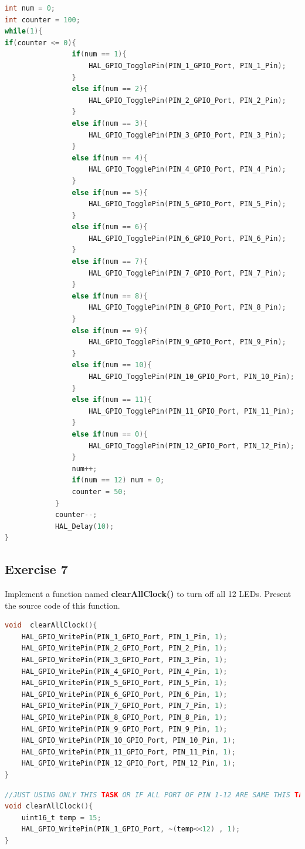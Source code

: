 \documentclass[twoside, final]{hcmut_report}
\begin{document}
\begin{lstlisting}[language=C, caption=Source code for Exercise 6]
int num = 0;
int counter = 100;
while(1){
if(counter <= 0){
			  	if(num == 1){
			  		HAL_GPIO_TogglePin(PIN_1_GPIO_Port, PIN_1_Pin);
			  	}
			  	else if(num == 2){
			  		HAL_GPIO_TogglePin(PIN_2_GPIO_Port, PIN_2_Pin);
			  	}
			  	else if(num == 3){
			  		HAL_GPIO_TogglePin(PIN_3_GPIO_Port, PIN_3_Pin);
			  	}
			  	else if(num == 4){
			  		HAL_GPIO_TogglePin(PIN_4_GPIO_Port, PIN_4_Pin);
			  	}
			  	else if(num == 5){
			  		HAL_GPIO_TogglePin(PIN_5_GPIO_Port, PIN_5_Pin);
			  	}
			  	else if(num == 6){
			  		HAL_GPIO_TogglePin(PIN_6_GPIO_Port, PIN_6_Pin);
			  	}
			  	else if(num == 7){
			  		HAL_GPIO_TogglePin(PIN_7_GPIO_Port, PIN_7_Pin);
			  	}
			  	else if(num == 8){
			  		HAL_GPIO_TogglePin(PIN_8_GPIO_Port, PIN_8_Pin);
			  	}
			  	else if(num == 9){
			  		HAL_GPIO_TogglePin(PIN_9_GPIO_Port, PIN_9_Pin);
			  	}
			  	else if(num == 10){
			  		HAL_GPIO_TogglePin(PIN_10_GPIO_Port, PIN_10_Pin);
			  	}
			  	else if(num == 11){
			  		HAL_GPIO_TogglePin(PIN_11_GPIO_Port, PIN_11_Pin);
			  	}
			  	else if(num == 0){
			  		HAL_GPIO_TogglePin(PIN_12_GPIO_Port, PIN_12_Pin);
			  	}
		  		num++;
		  		if(num == 12) num = 0;
		  		counter = 50;
		  	}
		  	counter--;
		  	HAL_Delay(10);
}
\end{lstlisting}

\subsection{Exercise 7}
Implement a function named \textbf{clearAllClock()} to turn off all 12 LEDs. Present the source code of this function.

\begin{lstlisting}[language=C, caption=Source code for the clearAllClock() function]
void  clearAllClock(){
	HAL_GPIO_WritePin(PIN_1_GPIO_Port, PIN_1_Pin, 1);
	HAL_GPIO_WritePin(PIN_2_GPIO_Port, PIN_2_Pin, 1);
	HAL_GPIO_WritePin(PIN_3_GPIO_Port, PIN_3_Pin, 1);
	HAL_GPIO_WritePin(PIN_4_GPIO_Port, PIN_4_Pin, 1);
	HAL_GPIO_WritePin(PIN_5_GPIO_Port, PIN_5_Pin, 1);
	HAL_GPIO_WritePin(PIN_6_GPIO_Port, PIN_6_Pin, 1);
	HAL_GPIO_WritePin(PIN_7_GPIO_Port, PIN_7_Pin, 1);
	HAL_GPIO_WritePin(PIN_8_GPIO_Port, PIN_8_Pin, 1);
	HAL_GPIO_WritePin(PIN_9_GPIO_Port, PIN_9_Pin, 1);
	HAL_GPIO_WritePin(PIN_10_GPIO_Port, PIN_10_Pin, 1);
	HAL_GPIO_WritePin(PIN_11_GPIO_Port, PIN_11_Pin, 1);
	HAL_GPIO_WritePin(PIN_12_GPIO_Port, PIN_12_Pin, 1);
}
\end{lstlisting}
\pagebreak
\begin{lstlisting}[language=C, caption=Source code for the clearAllClock() function]
//JUST USING ONLY THIS TASK OR IF ALL PORT OF PIN 1-12 ARE SAME THIS TASK.
void clearAllClock(){
	uint16_t temp = 15;
	HAL_GPIO_WritePin(PIN_1_GPIO_Port, ~(temp<<12) , 1);
}
\end{lstlisting}
\end{document}
